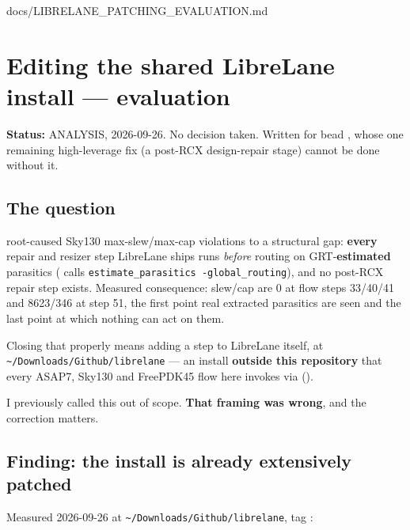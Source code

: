\begin{relocated}{docs/LIBRELANE_PATCHING_EVALUATION.md}
\section{Editing the shared LibreLane install --- evaluation}\label{tm:pd:librelane-patching}

\textbf{Status:} ANALYSIS, 2026-09-26. No decision taken. Written for
bead , whose one remaining high-leverage fix (a post-RCX
design-repair stage) cannot be done without it.

\subsection{The question}\label{tm:pd:librelane-patching:the-question}

 root-caused Sky130 max-slew/\allowbreak{}max-cap violations
to a structural gap: \textbf{every} repair and resizer step LibreLane
ships runs \emph{before} routing on GRT-\textbf{estimated} parasitics
( calls
\texttt{estimate\_\allowbreak{}parasitics\ -\allowbreak{}global\_\allowbreak{}routing}),
and no post-RCX repair step exists. Measured consequence: slew/cap are 0
at flow steps 33/40/41 and 8623/346 at step 51, the first point real
extracted parasitics are seen and the last point at which nothing can
act on them.

Closing that properly means adding a step to LibreLane itself, at
\texttt{\textasciitilde{}/\allowbreak{}Downloads/\allowbreak{}Github/\allowbreak{}librelane}
--- an install \textbf{outside this repository} that every ASAP7, Sky130
and FreePDK45 flow here invokes via 
().

I previously called this out of scope. \textbf{That framing was wrong},
and the correction matters.

\subsection{Finding: the install is already extensively patched}\label{tm:pd:librelane-patching:finding-the-install-is-already-extensively-patched}

Measured 2026-09-26 at
\texttt{\textasciitilde{}/\allowbreak{}Downloads/\allowbreak{}Github/\allowbreak{}librelane},
tag :


\end{relocated}

